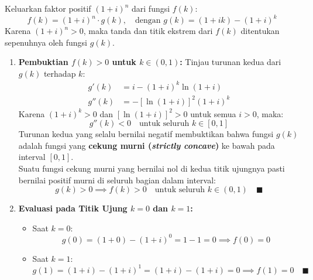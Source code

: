 \documentclass[11pt,a4paper]{article}
\begin{document}
\begin{solutionbox}[Soal 9]
Keluarkan faktor positif $(1+i)^n$ dari fungsi $f(k)$:
\begin{equation*}
    f(k) = (1+i)^n \cdot g(k), \quad \text{dengan } g(k) = (1 + ik) - (1+i)^k
\end{equation*}
Karena $(1+i)^n > 0$, maka tanda dan titik ekstrem dari $f(k)$ ditentukan sepenuhnya oleh fungsi $g(k)$.

\begin{enumerate}[label=(\alph*)]
    \item \textbf{Pembuktian $f(k) > 0$ untuk $k \in (0,1)$:}
    Tinjau turunan kedua dari $g(k)$ terhadap $k$:
    \begin{align*}
        g'(k) &= i - (1+i)^k \ln(1+i) \\[0.3em]
        g''(k) &= -\left[\ln(1+i)\right]^2 (1+i)^k
    \end{align*}
    Karena $(1+i)^k > 0$ dan $[\ln(1+i)]^2 > 0$ untuk semua $i > 0$, maka:
    \begin{equation*}
        g''(k) < 0 \quad \text{untuk seluruh } k \in [0, 1]
    \end{equation*}
    Turunan kedua yang selalu bernilai negatif membuktikan bahwa fungsi $g(k)$ adalah fungsi yang \textbf{cekung murni (\textit{strictly concave})} ke bawah pada interval $[0, 1]$.\\
    Suatu fungsi cekung murni yang bernilai nol di kedua titik ujungnya pasti bernilai positif murni di seluruh bagian dalam interval:
    \begin{equation*}
        g(k) > 0 \implies f(k) > 0 \quad \text{untuk seluruh } k \in (0, 1) \quad \blacksquare
    \end{equation*}

    \item \textbf{Evaluasi pada Titik Ujung $k = 0$ dan $k = 1$:}
    \begin{itemize}
        \item Saat $k = 0$:
        \begin{equation*}
            g(0) = (1 + 0) - (1+i)^0 = 1 - 1 = 0 \implies f(0) = 0
        \end{equation*}
        \item Saat $k = 1$:
        \begin{equation*}
            g(1) = (1 + i) - (1+i)^1 = (1 + i) - (1 + i) = 0 \implies f(1) = 0 \quad \blacksquare
        \end{equation*}
    \end{itemize}


\end{enumerate}
\end{solutionbox}
\end{document}
